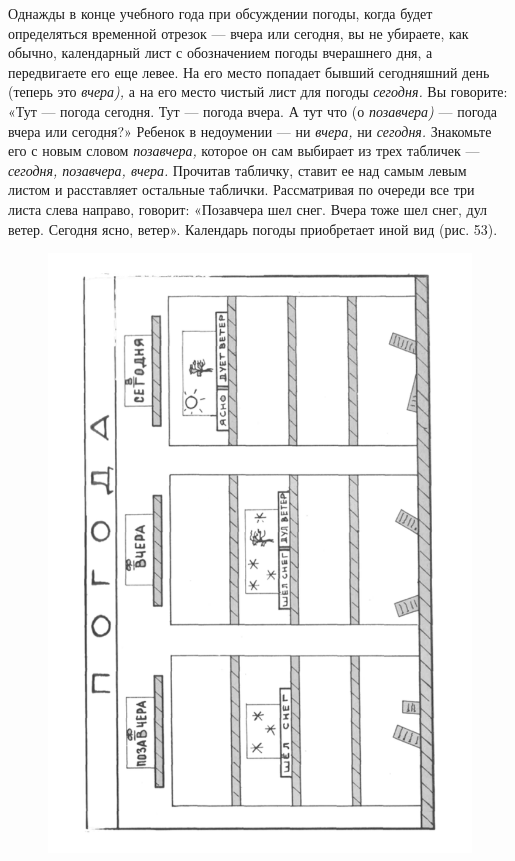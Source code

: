 \documentclass[a5paper]{book}
\renewcommand{\emph}[1]{\textit{#1}}
\begin{document}
Однажды в конце учебного года при обсуждении погоды, когда будет
определяться временной отрезок --- вчера или сегодня, вы не убираете,
как обычно, календарный лист с обозначением погоды вчерашнего дня, а
передвигаете его еще левее. На его место попадает бывший сегодняшний
день (теперь это \emph{вчера),} а на его место чистый лист для погоды
\emph{сегодня.} Вы говорите: «Тут --- погода сегодня. Тут --- погода
вчера. А тут что (о \emph{позавчера)} --- погода вчера или сегодня?»
Ребенок в недоумении --- ни \emph{вчера,} ни \emph{сегодня.} Знакомьте
его с новым словом \emph{позавчера,} которое он сам выбирает из трех
табличек --- \emph{сегодня, позавчера, вчера.} Прочитав табличку, ставит
ее над самым левым листом и расставляет остальные таблички. Рассматривая
по очереди все три листа слева направо, говорит: «Позавчера шел снег.
Вчера тоже шел снег, дул ветер. Сегодня ясно, ветер». Календарь погоды
приобретает иной вид (рис. 53).

\begin{figure}
\centering
\includegraphics[width=\linewidth]{media/media/image49.png}
\end{figure}
\end{document}
